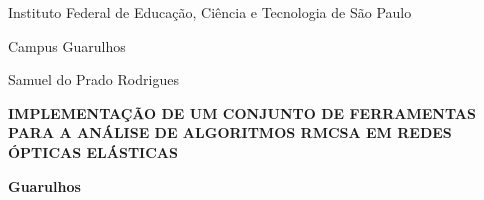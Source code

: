 \begin{center}

Instituto Federal de Educação, Ciência e Tecnologia de São Paulo

Campus Guarulhos

\vspace{1cm}

Samuel do Prado Rodrigues

\vspace*{\fill}

\textbf{\MakeUppercase{Implementação de um conjunto de ferramentas para a análise de algoritmos RMCSA em redes ópticas elásticas}}

\vfill

\textbf{Guarulhos}

\textbf{\the\year{}}

\thispagestyle{empty}

\end{center}
